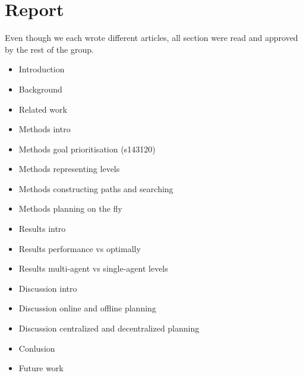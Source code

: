 \documentclass[a4paper]{article}
\begin{document}
\section{Report}
Even though we each wrote different articles, all section were read
and approved by the rest of the group.
\begin{itemize}
  \item Introduction
  \item Background
  \item Related work
  \item Methods intro
  \item Methods goal prioritisation (s143120)
  \item Methods representing levels
  \item Methods constructing paths and searching
  \item Methods planning on the fly
  \item Results intro
  \item Results performance vs optimally
  \item Results multi-agent vs single-agent levels
  \item Discussion intro
  \item Discussion online and offline planning
  \item Discussion centralized and decentralized planning
  \item Conlusion
  \item Future work
\end{itemize}
\end{document}
